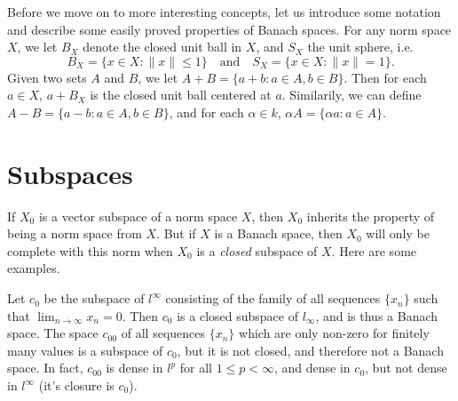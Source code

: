 Before we move on to more interesting concepts, let us introduce some notation and describe some easily proved properties of Banach spaces. For any norm space $X$, we let $B_X$ denote the closed unit ball in $X$, and $S_X$ the unit sphere, i.e.
%
\[ B_X = \{ x \in X: \| x \| \leq 1 \}\quad\text{and}\quad S_X = \{ x \in X: \| x \| = 1 \}. \]
%
Given two sets $A$ and $B$, we let $A + B = \{ a + b : a \in A, b \in B \}$. Then for each $a \in X$, $a + B_X$ is the closed unit ball centered at $a$. Similarily, we can define $A - B = \{ a - b : a \in A, b \in B \}$, and for each $\alpha \in k$, $\alpha A = \{ \alpha a : a \in A \}$.

\section{Subspaces}

If $X_0$ is a vector subspace of a norm space $X$, then $X_0$ inherits the property of being a norm space from $X$. But if $X$ is a Banach space, then $X_0$ will only be complete with this norm when $X_0$ is a \emph{closed} subspace of $X$. Here are some examples.

\begin{example}
    Let $c_0$ be the subspace of $l^\infty$ consisting of the family of all sequences $\{ x_n \}$ such that $\lim_{n \to \infty} x_n = 0$. Then $c_0$ is a closed subspace of $l_\infty$, and is thus a Banach space. The space $c_{00}$ of all sequences $\{ x_n \}$ which are only non-zero for finitely many values is a subspace of $c_0$, but it is not closed, and therefore not a Banach space. In fact, $c_{00}$ is dense in $l^p$ for all $1 \leq p < \infty$, and dense in $c_0$, but not dense in $l^\infty$ (it's closure is $c_0$).
\end{example}

